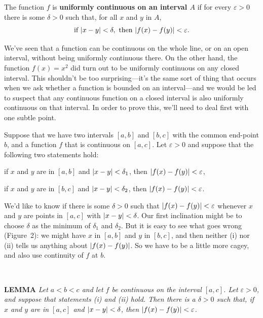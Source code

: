 \begin{spivakdefn}
The function $f$ is \textbf{uniformly continuous on an interval $A$} if for
every $\varepsilon > 0$ there is some $\delta > 0$ such that, for all $x$ and
$y$ in $A$,
\[
\text{if }\lvert x - y\rvert < \delta,\text{ then }\lvert f(x) - f(y)\rvert < \varepsilon.
\]
\end{spivakdefn}

We've seen that a function can be continuous on the whole line, or on an open
interval, without being uniformly continuous there. On the other hand, the
function $f(x) = x^2$ did turn out to be uniformly continuous on any closed
interval. This shouldn't be too surprising---it's the same sort of thing that
occurs when we ask whether a function is bounded on an interval---and we
would be led to suspect that any continuous function on a closed interval is
also uniformly continuous on that interval. In order to prove this, we'll
need to deal first with one subtle point.

Suppose that we have two intervals $[a,b]$ and $[b,c]$ with the common
end-point $b$, and a function $f$ that is continuous on $[a,c]$. Let
$\varepsilon > 0$ and suppose that the following two statements hold:
\begin{romans}
\item if $x$ and $y$ are in $[a,b]$ and $\lvert x - y\rvert < \delta_1$, then
  $\lvert f(x) - f(y)\rvert < \varepsilon$,
\item if $x$ and $y$ are in $[b,c]$ and $\lvert x - y\rvert < \delta_2$, then
  $\lvert f(x) - f(y)\rvert < \varepsilon$.
\end{romans}
We'd like to know if there is some $\delta > 0$ such that
$\lvert f(x) - f(y)\rvert < \varepsilon$ whenever $x$ and $y$ are points in $[a,c]$
with $\lvert x - y\rvert < \delta$. Our first inclination might be to choose
$\delta$ as the minimum of $\delta_1$ and $\delta_2$. But it is easy to see
what goes wrong (Figure~2): we might have $x$ in $[a,b]$ and $y$ in $[b,c]$,
and then neither (i) nor (ii) tells us anything about $\lvert f(x) - f(y)\rvert$.
So we have to be a little more cagey, and also use continuity of $f$ at $b$.
\begin{center}
\\[0.6em]
\end{center}

\medskip
\noindent\textbf{LEMMA}\enspace
\textit{Let $a < b < c$ and let $f$ be continuous on the interval $[a,c]$.
Let $\varepsilon > 0$, and suppose that statements \textup{(i)} and
\textup{(ii)} hold. Then there is a $\delta > 0$ such that, if $x$ and $y$
are in $[a,c]$ and $\lvert x - y\rvert < \delta$, then
$\lvert f(x) - f(y)\rvert < \varepsilon$.}

